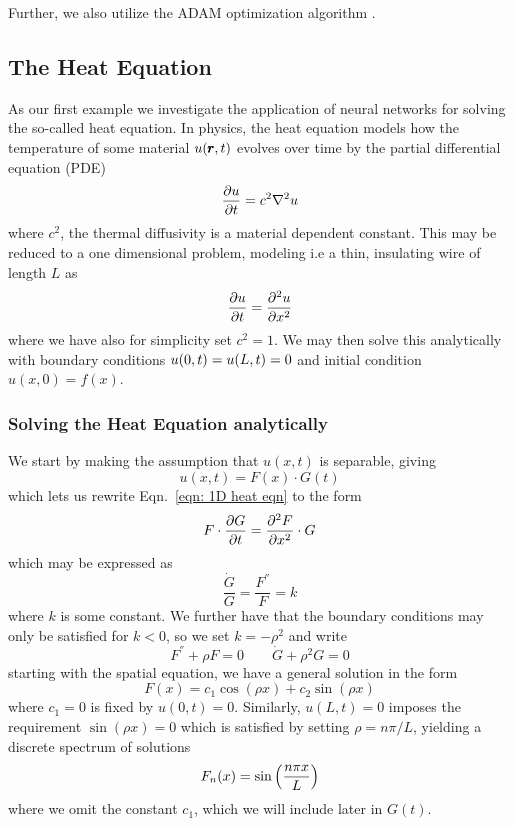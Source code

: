 \documentclass[reprint, english, nofootinbib]{revtex4-2}
\begin{document}
Further, we also utilize the ADAM optimization algorithm \cite{kingma2017adam}. 

\subsection{The Heat Equation\label{sec:Heat equation analytical}}
\noindent
As our first example we investigate the application of neural networks for solving the so-called heat equation. In physics, the heat equation models how the temperature of some material $u\qty(\pmb r, t)$ evolves over time by the partial differential equation (PDE)
\begin{equation}
    \pdv{u}{t} = c^2\nabla^2 u 
\end{equation}
where $c^2$, the thermal diffusivity is a material dependent constant. 
This may be reduced to a one dimensional problem, modeling i.e a thin, insulating wire of length $L$ as
\begin{equation}\label{eqn: 1D heat eqn}
    \pdv{u}{t} = \pdv[2]{u}{x}
\end{equation}
where we have also for simplicity set $c^2 = 1$. We may then solve this analytically with boundary conditions $u\qty(0, t) = u\qty(L,t) = 0$ and initial condition $u(x, 0) = f(x)$.

\subsubsection{Solving the Heat Equation analytically}
\noindent 
We start by making the assumption that $u(x, t)$ is separable, giving 
\begin{equation}
    u(x, t) = F(x) \cdot G(t)
\end{equation}
which lets us rewrite Eqn.~\ref{eqn: 1D heat eqn} to the form
\begin{equation}
    F \cdot \pdv{G}{t} = \pdv[2]{F}{x} \cdot G
\end{equation}
which may be expressed as
\begin{equation}
    \frac{\dot G}{G} = \frac{F^{''}}{F} = k
\end{equation}
where $k$ is some constant. We further have that the boundary conditions may only be satisfied for $k <  0$, so we set $k = -\rho^2$ and write
\begin{equation}
    F^{''} + \rho F = 0 \quad \quad \dot G + \rho^2G = 0
\end{equation}
starting with the spatial equation, we have a general solution in the form 
\begin{equation}
    F(x) = c_1 \cos(\rho x) + c_2 \sin(\rho x)
\end{equation}
where $c_1 = 0$ is fixed by $u(0, t) = 0$. Similarly, $u(L, t) = 0$ imposes the requirement $\sin(\rho x) = 0$ which is satisfied by setting $\rho = n\pi/L$, yielding a discrete spectrum of solutions
\begin{equation}
    F_n(x) = \sin\qty(\frac{n\pi x}{L})
\end{equation}
where we omit the constant $c_1$, which we will include later in $G(t)$. 
\end{document}
